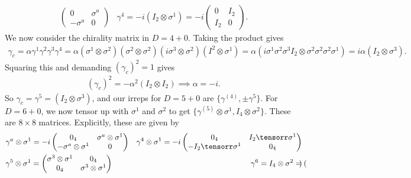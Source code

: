 \documentclass[11pt]{article}
\begin{document}
\begin{eexample}
\begin{align*}
\begin{pmatrix}
            0 & \sigma^a\\
            - \sigma^a & 0
        \end{pmatrix}
        & \gamma^4 = -i(I_2 \otimes \sigma^1) = -i \begin{pmatrix}
            0 & I_2\\
            I_2 & 0
        \end{pmatrix}.
    \end{align*}
    We now consider the chirality matrix in $D = 4 + 0$.
    Taking the product gives
    \begin{align*}
        \gamma_c = \alpha \gamma^1 \gamma^2 \gamma^3 \gamma^4
        = \alpha (\sigma^{1} \otimes \sigma^{2})(\sigma^{2} \otimes \sigma^{2}) (i\sigma^{3} \otimes \sigma^{2})(I^{2} \otimes \sigma^{1})
        = \alpha (i \sigma^1 \sigma^2 \sigma^3 I_2 \otimes \sigma^2 \sigma^2 \sigma^2 \sigma^1)
        = i \alpha (I_2 \otimes \sigma^3).
    \end{align*}
    Squaring this and demanding $(\gamma_c)^2 = 1$ gives
    \begin{align*}
        (\gamma_c)^2 = - \alpha^2 (I_2 \otimes I_2) \implies \alpha = - i.
    \end{align*}
    So $\gamma_c = \gamma^5 = (I_2 \otimes \sigma^3)$, and our irreps
    for $D = 5 + 0$ are $\{ \gamma^{(4)}, \pm \gamma^5\}$.
    For $D = 6 + 0$, we now tensor up with $\sigma^1$ and $\sigma^2$ to get
    $\{ \gamma^{(5)} \otimes \sigma^1, I_4 \otimes \sigma^2 \}$.
    These are $8 \times 8$ matrices. Explicitly, these are given by
    \begin{align*}
        & \gamma^a \otimes \sigma^1 = -i \begin{pmatrix}
            0_4 & \sigma^a \otimes \sigma^1\\
            - \sigma^a \otimes \sigma^1 & 0
        \end{pmatrix}
        & \gamma^4 \otimes \sigma^1 = - i \begin{pmatrix}
            0_4 & I_2 \tensorr \sigma^1\\
            - I_2 \tensorr \sigma^1 & 0_4
        \end{pmatrix}\\
        & \gamma^5 \otimes \sigma^1 = \begin{pmatrix}
            \sigma^3 \otimes \sigma^1 & 0_4\\
            0_4 & \sigma^3 \otimes \sigma^1
        \end{pmatrix}
        & \gamma^6 = I_4 \otimes \sigma^2 = \begin{pmatrix}

\end{pmatrix}
\end{align*}
\end{eexample}
\end{document}
